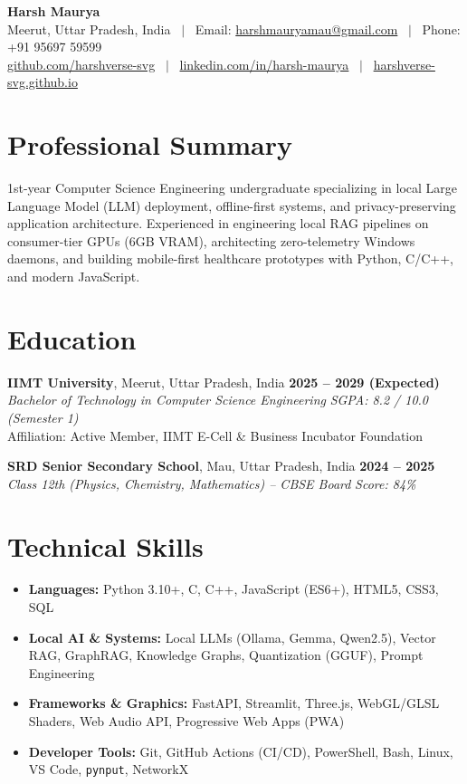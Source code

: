\documentclass[10pt,a4paper]{article}
\begin{document}
\begin{center}
    {\Huge \textbf{Harsh Maurya}}\\[0.3em]
    \small Meerut, Uttar Pradesh, India \ $|$ \ 
    Email: \href{mailto:harshmauryamau@gmail.com}{harshmauryamau@gmail.com} \ $|$ \ 
    Phone: +91 95697 59599\\[0.2em]
    \href{https://github.com/harshverse-svg}{github.com/harshverse-svg} \ $|$ \ 
    \href{https://www.linkedin.com/in/harsh-maurya-baa534400}{linkedin.com/in/harsh-maurya} \ $|$ \ 
    \href{https://harshverse-svg.github.io/harsh-maurya-portfolio/}{harshverse-svg.github.io}
\end{center}

\vspace{-0.5em}
\section{Professional Summary}
1st-year Computer Science Engineering undergraduate specializing in local Large Language Model (LLM) deployment, offline-first systems, and privacy-preserving application architecture. Experienced in engineering local RAG pipelines on consumer-tier GPUs (6GB VRAM), architecting zero-telemetry Windows daemons, and building mobile-first healthcare prototypes with Python, C/C++, and modern JavaScript.

\section{Education}
\textbf{IIMT University}, Meerut, Uttar Pradesh, India \hfill \textbf{2025 -- 2029 (Expected)}\\
\textit{Bachelor of Technology in Computer Science Engineering} \hfill \textit{SGPA: 8.2 / 10.0 (Semester 1)}\\
Affiliation: Active Member, IIMT E-Cell \& Business Incubator Foundation

\vspace{0.4em}
\textbf{SRD Senior Secondary School}, Mau, Uttar Pradesh, India \hfill \textbf{2024 -- 2025}\\
\textit{Class 12th (Physics, Chemistry, Mathematics) -- CBSE Board} \hfill \textit{Score: 84\%}

\section{Technical Skills}
\begin{itemize}
    \item \textbf{Languages:} Python 3.10+, C, C++, JavaScript (ES6+), HTML5, CSS3, SQL
    \item \textbf{Local AI \& Systems:} Local LLMs (Ollama, Gemma, Qwen2.5), Vector RAG, GraphRAG, Knowledge Graphs, Quantization (GGUF), Prompt Engineering
    \item \textbf{Frameworks \& Graphics:} FastAPI, Streamlit, Three.js, WebGL/GLSL Shaders, Web Audio API, Progressive Web Apps (PWA)
    \item \textbf{Developer Tools:} Git, GitHub Actions (CI/CD), PowerShell, Bash, Linux, VS Code, \texttt{pynput}, NetworkX
\end{itemize}
\end{document}
